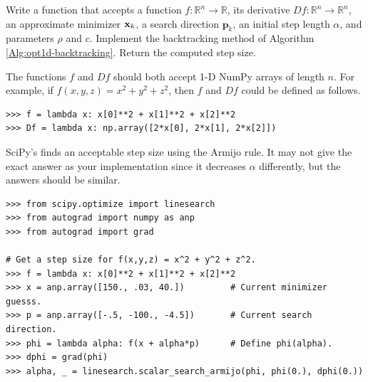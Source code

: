 \begin{problem}
Write a function that accepts a function $f:\mathbb{R}^n\rightarrow\mathbb{R}$, its derivative $Df:\mathbb{R}^n\rightarrow\mathbb{R}^n$, an approximate minimizer $\mathbf{x}_k$, a search direction $\textbf{p}_k$, an initial step length $\alpha$, and parameters $\rho$ and $c$.
Implement the backtracking method of Algorithm \ref{Alg:opt1d-backtracking}.
Return the computed step size.

The functions $f$ and $Df$ should both accept 1-D NumPy arrays of length $n$.
For example, if $f(x,y,z) = x^2 + y^2 + z^2$, then $f$ and $Df$ could be defined as follows.
\begin{lstlisting}
>>> f = lambda x: x[0]**2 + x[1]**2 + x[2]**2
>>> Df = lambda x: np.array([2*x[0], 2*x[1], 2*x[2]])
\end{lstlisting}

SciPy's  finds an acceptable step size using the Armijo rule.
It may not give the exact answer as your implementation since it decreases $\alpha$ differently, but the answers should be similar.
\begin{lstlisting}
>>> from scipy.optimize import linesearch
>>> from autograd import numpy as anp
>>> from autograd import grad

# Get a step size for f(x,y,z) = x^2 + y^2 + z^2.
>>> f = lambda x: x[0]**2 + x[1]**2 + x[2]**2
>>> x = anp.array([150., .03, 40.])         # Current minimizer guesss.
>>> p = anp.array([-.5, -100., -4.5])       # Current search direction.
>>> phi = lambda alpha: f(x + alpha*p)      # Define phi(alpha).
>>> dphi = grad(phi)
>>> alpha, _ = linesearch.scalar_search_armijo(phi, phi(0.), dphi(0.))
\end{lstlisting}
\end{problem}

